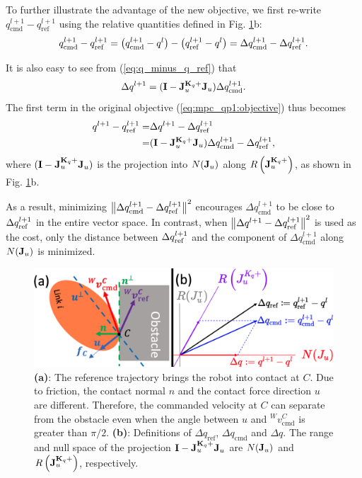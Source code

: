 To further illustrate the advantage of the new objective, we first re-write $q_\text{cmd}^{l+1} - q_\text{ref}^{l+1}$ using the relative quantities defined in Fig. \ref{fig:frictional_contact_objective}b:
\begin{equation}
q_\text{cmd}^{l+1} - \qref[l+1] = \left(q_\text{cmd}^{l+1} - q^l \right) - \left(\qref[l+1] - q^l \right) = \Delta q_\text{cmd}^{l+1} - \Delta \qref[l+1].
\end{equation}

It is also easy to see from (\ref{eq:q_minus_q_ref}) that
\begin{equation}
\Delta q^{l+1} = (\mb{I} - \J_u^{\mb{K}_q+}\J_u) \Delta q_\text{cmd}^{l+1}.
\end{equation}
The first term in the original objective (\ref{eq:mpc_qp1:objective}) thus becomes
\begin{equation}
\begin{aligned}
q^{l+1} - \qref[l+1] =& \Delta q^{l+1} - \Delta \qref[l+1] \\
=& (\mb{I} - \J_u^{\mb{K}_q+}\J_u) \Delta q_\text{cmd}^{l+1} - \Delta \qref[l+1],
\end{aligned}
\end{equation}
where $(\mb{I} - \J_u^{\mb{K}_q+}\J_u)$ is the projection into $N(\J_u)$ along $R\left(\J_u^{\mb{K}_q+}\right)$, as shown in Fig. \ref{fig:frictional_contact_objective}b. 

As a result, minimizing $\norm{\Delta q_\text{cmd}^{l+1} - \Delta \qref[l+1]}^2$ encourages $\Delta q_\text{cmd}^{l+1}$ to be close to $\Delta \qref[l+1]$ in the entire vector space. In contrast, when $\norm{\Delta q^{l+1} - \Delta \qref[l+1]}^2$ is used as the cost, only the distance between $\Delta \qref[l+1]$ and the component of $\Delta q_\text{cmd}^{l+1}$ along $N(\J_u)$ is minimized.

\begin{figure}[h]
\centering
\includegraphics[width=0.80\linewidth]{figures/04_control/frictional_contact_objective.png}
\caption{\textbf{(a)}: The reference trajectory brings the robot into contact at $C$. Due to friction, the contact normal $n$ and the contact force direction $u$ are different. Therefore, the commanded velocity at $C$ can separate from the obstacle even when the angle between $u$ and ${}^W v^C_\text{cmd}$ is greater than $\pi / 2$. \textbf{(b)}: Definitions of $\Delta q_\text{ref}$, $\Delta q_\text{cmd}$ and $\Delta q$. The range and null space of the projection $\mb{I} - \J_u^{\mb{K}_q+}\J_u$ are $N(\J_u)$ and $R\left(\J_u^{\mb{K}_q+}\right)$, respectively.}
\label{fig:frictional_contact_objective}
\end{figure}

